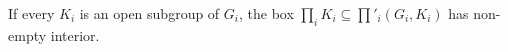 If every $K_i$ is an open subgroup of $G_i$, the box $\prod_iK_i\subseteq\prod'_i(G_i,K_i)$ has non-empty interior.
